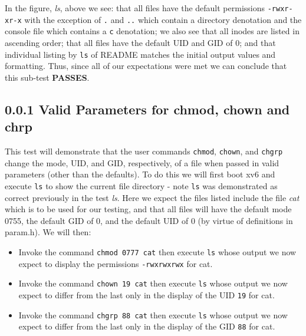\documentclass[11pt,letterpaper]{report}
\begin{document}
\pagebreak

In the figure, \emph{ls}, above we see: that all files have the default permissions {\tt -rwxr-xr-x} with the exception of {\tt .} and {\tt ..} which contain a directory denotation and the console
file which contains a {\tt c} denotation; we also see that all inodes are listed in ascending order; that all files have the default UID and GID of 0; and that individual listing by {\tt ls} of README 
matches the initial output values and formatting. Thus, since all of our expectations were met we can conclude that this sub-test \textbf{PASSES}.

		
		 		
		\subsection*{0.0.1 Valid Parameters for chmod, chown and chrp}
		This test will demonstrate that the user commands {\tt chmod}, {\tt chown}, and {\tt chgrp} change the mode, UID, and GID, respectively, of a file when passed in valid parameters (other than the defaults).
		To do this we will first boot xv6 and execute {\tt ls} to show the current file directory - note {\tt ls} was demonstrated as correct previously in the test \emph{ls}. Here we expect the files listed include the file \emph{cat} which is to 
		be used for our testing, and that all files will have the default
		mode 0755, the default GID of 0, and the default UID of 0 (by virtue of definitions in param.h). We will then:
		\begin{itemize}
			\item Invoke the command {\tt chmod 0777 cat} then execute {\tt ls} whose output we now expect to display the permissions {\tt -rwxrwxrwx} for cat.
			\item Invoke the command {\tt chown 19 cat} then execute {\tt ls} whose output we now expect to differ from the last only in the display of the UID {\tt 19} for cat.
			\item Invoke the command {\tt chgrp 88 cat} then execute {\tt ls} whose output we now expect to differ from the last only in the display of the GID {\tt 88} for cat.
		\end{itemize}
\end{document}
